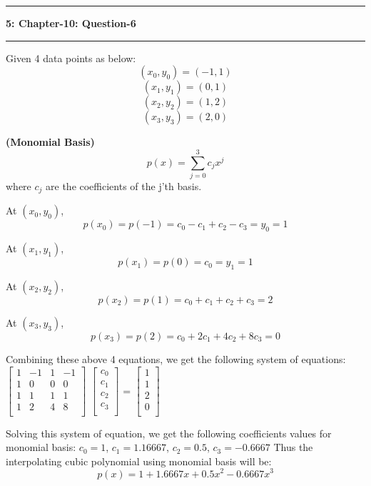 \documentclass{article}
\newcommand\question[2]{\vspace{.25in}\hrule\textbf{#1: #2}\hrule\vspace{.10in}}
\renewcommand\part[1]{\vspace{.10in}\textbf{(#1)}}
\begin{document}
\question{5}{Chapter-10: Question-6}
Given 4 data points as below:
\[(x_0,y_0) = (-1,1)\]
\[(x_1,y_1) = (0,1)\]
\[(x_2,y_2) = (1,2)\]
\[(x_3,y_3) = (2,0)\]

\part{Monomial Basis} 
\[ p(x) = \sum_{j=0}^3 c_jx^j\]
where $c_j$ are the coefficients of the j'th basis. \newline

At $(x_0, y_0)$, 
\[p(x_0) = p(-1) = c_0 - c_1 + c_2 - c_3 = y_0 = 1\]

At $(x_1, y_1)$,
\[p(x_1) = p(0) = c_0 = y_1 = 1\]

At $(x_2, y_2)$,
\[ p(x_2) = p(1) = c_0 + c_1 + c_2 + c_3 = 2 \]

At $(x_3, y_3)$,
\[ p(x_3) = p(2) = c_0 + 2c_1 + 4c_2 + 8c_3 = 0\]

Combining these above 4 equations, we get the following system of equations: \newline
$\begin{bmatrix} 
	1 & -1 & 1 & -1 \\
	1 & 0 & 0 & 0 \\
	1 & 1 & 1 & 1 \\
	1 & 2 & 4 & 8 \\
\end{bmatrix}$ $\begin{bmatrix}
			c_0 \\
			c_1 \\
			c_2 \\
			c_3 \\
\end{bmatrix}$ = $\begin{bmatrix}
			1 \\
			1 \\
			2 \\
			0 \\
		  \end{bmatrix}$

Solving this system of equation, we get the following coefficients values for monomial basis: \newline
\hspace*{0.5cm} $c_0 = 1$, $c_1 = 1.16667$, $c_2 = 0.5$, $c_3 = -0.6667$ \newline
Thus the interpolating cubic polynomial using monomial basis will be:
\begin{equation}
	p(x) = 1 + 1.6667 x + 0.5x^2 - 0.6667 x^3
 \label{eq:mono}
\end{equation}
\end{document}
